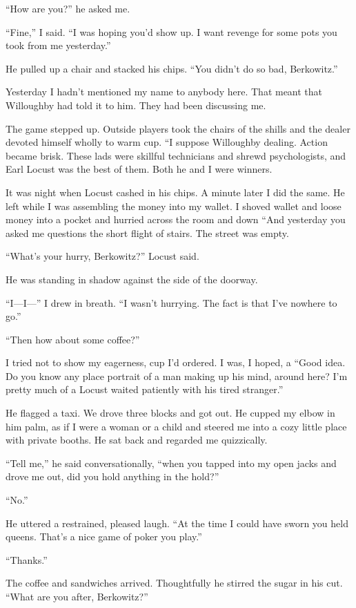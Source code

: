 \documentclass{novel}
\begin{document}
“How are you?” he asked me.

“Fine,” I said. “I was hoping you’d show up. I want revenge for some pots you took from me yesterday.”

He pulled up a chair and stacked his chips. “You didn’t do so bad, Berkowitz.”

Yesterday I hadn’t mentioned my name to anybody here. That meant that Willoughby had told it to him. They had been discussing me.

The game stepped up. Outside players took the chairs of the shills and the dealer devoted himself wholly to warm cup. “I suppose Willoughby dealing. Action became brisk. These lads were skillful technicians and shrewd psychologists, and Earl Locust was the best of them. Both he and I were winners.

It was night when Locust cashed in his chips. A minute later I did the same. He left while I was assembling the money into my wallet. I shoved wallet and loose money into a pocket and hurried across the room and down “And yesterday you asked me questions the short flight of stairs. The street was empty.

“What’s your hurry, Berkowitz?” Locust said.

He was standing in shadow against the side of the doorway.

“I—I—” I drew in breath. “I wasn’t hurrying. The fact is that I’ve nowhere to go.”

“Then how about some coffee?”

I tried not to show my eagerness, cup I’d ordered. I was, I hoped, a “Good idea. Do you know any place portrait of a man making up his mind, around here? I’m pretty much of a Locust waited patiently with his tired stranger.”

He flagged a taxi. We drove three blocks and got out. He cupped my elbow in him palm, as if I were a woman or a child and steered me into a cozy little place with private booths. He sat back and regarded me quizzically.

“Tell me,” he said conversationally, “when you tapped into my open jacks and drove me out, did you hold anything in the hold?”

“No.”

He uttered a restrained, pleased laugh. “At the time I could have sworn you held queens. That’s a nice game of poker you play.”

“Thanks.”

The coffee and sandwiches arrived. Thoughtfully he stirred the sugar in his cut. “What are you after, Berkowitz?”
\end{document}
